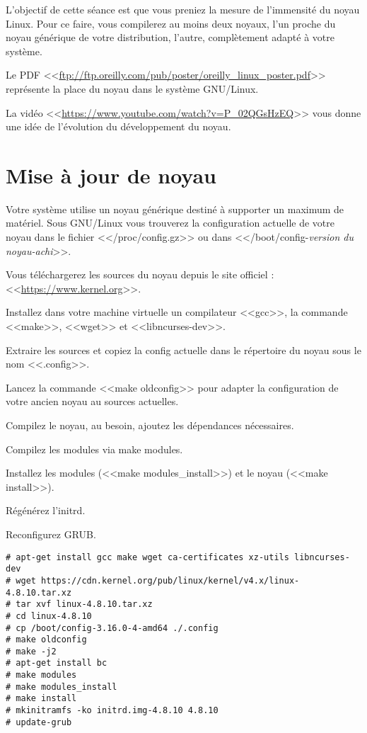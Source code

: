 \documentclass[11pt]{article}
\newcommand{\numtd}{12}
\newcommand{\titretd}{Le noyau Linux}
\begin{document}
\entete{\numtd}{\titretd}

\begin{introduction}
L'objectif de cette séance est que vous preniez la mesure de l'immensité du noyau Linux. Pour ce faire, vous compilerez au moins deux noyaux, l'un proche du noyau générique de votre distribution, l'autre, complètement adapté à votre système.

Le PDF <<\url{ftp://ftp.oreilly.com/pub/poster/oreilly_linux_poster.pdf}>> représente la place du noyau dans le système GNU/Linux.

La vidéo <<\url{https://www.youtube.com/watch?v=P_02QGsHzEQ}>> vous donne une idée de l'évolution du développement du noyau.
\end{introduction}

\section{Mise à jour de noyau}

Votre système utilise un noyau générique destiné à supporter un maximum de matériel. Sous GNU/Linux vous trouverez la configuration actuelle de votre noyau dans le fichier <</proc/config.gz>> ou dans <</boot/config-\textit{version du noyau-achi}>>.

Vous téléchargerez les sources du noyau depuis le site officiel : <<\url{https://www.kernel.org}>>.

Installez dans votre machine virtuelle un compilateur <<gcc>>, la commande <<make>>, <<wget>> et <<libncurses-dev>>.

Extraire les sources et copiez la config actuelle dans le répertoire du noyau sous le nom <<.config>>.

Lancez la commande <<make oldconfig>> pour adapter la configuration de votre ancien noyau au sources actuelles.

Compilez le noyau, au besoin, ajoutez les dépendances nécessaires.

Compilez les modules via make modules.

Installez les modules (<<make modules\_install>>) et le noyau (<<make install>>).

Régénérez l'initrd.

Reconfigurez GRUB.

\begin{solution}
\begin{lstlisting}
# apt-get install gcc make wget ca-certificates xz-utils libncurses-dev
# wget https://cdn.kernel.org/pub/linux/kernel/v4.x/linux-4.8.10.tar.xz
# tar xvf linux-4.8.10.tar.xz
# cd linux-4.8.10
# cp /boot/config-3.16.0-4-amd64 ./.config
# make oldconfig
# make -j2
# apt-get install bc
# make modules
# make modules_install
# make install
# mkinitramfs -ko initrd.img-4.8.10 4.8.10
# update-grub
\end{lstlisting}
\end{solution}
\end{document}
